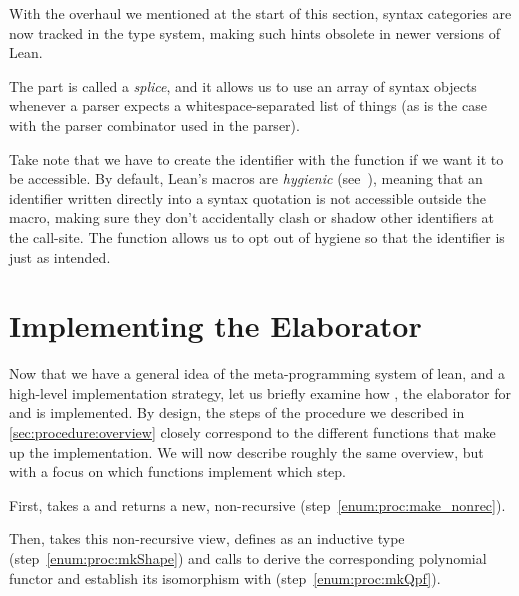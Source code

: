 \begin{remark}
    With the overhaul we mentioned at the start of this section, syntax categories are now tracked in the 
    type system, making such hints obsolete in newer versions of Lean.
\end{remark}

The \lean{\$[...]*} part is called a \emph{splice}, and it allows us to use an array of syntax objects whenever a parser expects a whitespace-separated list of things (as is the case with the  parser combinator used in the \inductive{} parser).

Take note that we have to create the identifier  with the  function if
we want it to be accessible. By default, Lean's macros are \emph{hygienic} (see~\cite{ullrichNotationsHygienicMacro2022}),
meaning that an identifier  written directly into a syntax quotation is not accessible outside the macro, making sure they don't accidentally clash or shadow other identifiers at the call-site.
The  function allows us to opt out of hygiene so that the identifier is just  as intended.






\section{Implementing the Elaborator}%
\label{sec:implementing}

Now that we have a general idea of the meta-programming system of lean, and a high-level implementation strategy, let us 
briefly examine how , the elaborator for \data{} and \codata{} is implemented.
By design, the steps of the procedure we described in \cref{sec:procedure:overview} closely correspond to the different functions that make up the  implementation.
We will now describe roughly the same overview, but with a focus
on which functions implement which step.

First,  takes a  and returns a new, non-recursive  (step~\ref{enum:proc:make_nonrec}).  

Then,  takes this non-recursive view, defines  as an inductive type (step~\ref{enum:proc:mkShape}) and calls  to derive the corresponding polynomial functor and establish its isomorphism with  (step~\ref{enum:proc:mkQpf}).

